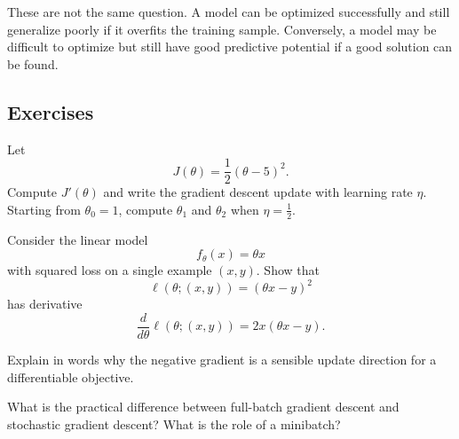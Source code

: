 These are not the same question. A model can be optimized successfully and still generalize poorly if it overfits the training sample. Conversely, a model may be difficult to optimize but still have good predictive potential if a good solution can be found.



\subsection*{Exercises}

\begin{exercise}
Let
\[
J(\theta)=\frac12(\theta-5)^2.
\]
Compute $J'(\theta)$ and write the gradient descent update with learning rate $\eta$. Starting from $\theta_0=1$, compute $\theta_1$ and $\theta_2$ when $\eta=\frac12$.
\end{exercise}

\begin{exercise}
Consider the linear model
\[
f_\theta(x)=\theta x
\]
with squared loss on a single example $(x,y)$. Show that
\[
\ell(\theta;(x,y))=(\theta x-y)^2
\]
has derivative
\[
\frac{d}{d\theta}\ell(\theta;(x,y))=2x(\theta x-y).
\]
\end{exercise}

\begin{exercise}
Explain in words why the negative gradient is a sensible update direction for a differentiable objective.
\end{exercise}

\begin{exercise}
What is the practical difference between full-batch gradient descent and stochastic gradient descent? What is the role of a minibatch?
\end{exercise}

